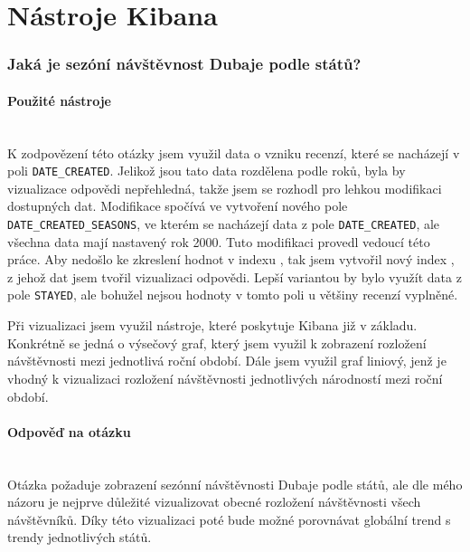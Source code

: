 \documentclass[czech,BP]{thesiskiv}
\begin{document}
\section{Nástroje Kibana}
\subsubsection{Jaká je sezóní návštěvnost Dubaje podle států?}
\label{subsub:Návštěvnost}
\paragraph{Použité nástroje}
\mbox{}\\
K zodpovězení této otázky jsem využil data o vzniku recenzí, které se nacházejí v poli \texttt{DATE\_CREATED}. Jelikož jsou tato data rozdělena podle roků, byla by vizualizace odpovědi nepřehledná, takže jsem se rozhodl pro lehkou modifikaci dostupných dat. Modifikace spočívá ve vytvoření nového pole \texttt{DATE\_CREATED\_SEASONS}, ve kterém se nacházejí data z pole \texttt{DATE\_CREATED}, ale všechna data mají nastavený rok 2000. Tuto modifikaci provedl vedoucí této práce. Aby nedošlo ke zkreslení hodnot v indexu , tak jsem vytvořil nový index , z jehož dat jsem tvořil vizualizaci odpovědi. Lepší variantou by bylo využít data z pole \texttt{STAYED}, ale bohužel nejsou hodnoty v tomto poli u většiny recenzí vyplněné. 


Při vizualizaci jsem využil nástroje, které poskytuje Kibana již v základu. Konkrétně se jedná o výsečový graf, který jsem využil k zobrazení rozložení návštěvnosti mezi jednotlivá roční období. Dále jsem využil graf liniový, jenž je vhodný k vizualizaci rozložení návštěvnosti jednotlivých národností mezi roční období.

\paragraph{Odpověď na otázku}
\mbox{}\\
Otázka požaduje zobrazení sezónní návštěvnosti Dubaje podle států, ale dle mého názoru je nejprve důležité vizualizovat obecné rozložení návštěvnosti všech návštěvníků. Díky této vizualizaci poté bude možné porovnávat globální trend s trendy jednotlivých států.
\end{document}
